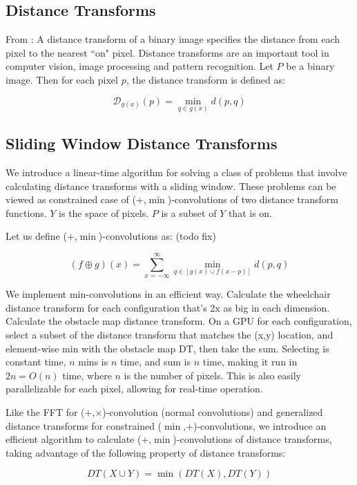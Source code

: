 \subsection{Distance Transforms}
From \cite{felzenszwalb2004distance}:
A distance transform of a binary image specifies the distance from each pixel to
the nearest ``on" pixel. Distance transforms are an important tool in computer
vision, image processing and pattern recognition.
Let $P$ be a binary image. Then for each pixel $p$, the distance transform is
defined as:

$$\mathcal{D}_{g(x)}(p) = \min_{q \in g(x)} d(p,q) $$

\subsection{Sliding Window Distance Transforms}
We introduce a linear-time algorithm for solving a class of problems that involve
calculating distance transforms with a sliding window. These problems can be
viewed as constrained case of ($+$,$\min$)-convolutions of two distance
transform functions. 
$Y$ is the space of pixels.
$P$ is a subset of $Y$ that is on.

Let us define ($+$,$\min$)-convolutions as: (todo fix)

$$ (f \oplus g) (x) = \sum_{x = -\infty}^\infty \min_{q \in [g(x) \cup f(x - p)]} d(p,q) $$


We implement min-convolutions in an efficient way.
Calculate the wheelchair distance transform for each configuration that's 2x as big in each dimension.
Calculate the obstacle map distance transform.
On a GPU for each configuration, select a subset of the distance transform that
matches the (x,y) location, and element-wise min with the obstacle map DT, then
take the sum. Selecting is constant time, $n$ mins is $n$ time, and sum is $n$
time, making it run in $2n = O(n)$ time, where $n$ is the number of pixels. This
is also easily parallelizable for each pixel, allowing for real-time operation.

Like the FFT for ($+$,$\times$)-convolution (normal convolutions) and generalized distance
transforms for constrained ($\min$,$+$)-convolutions, we introduce an efficient
algorithm to calculate ($+$,$\min$)-convolutions of distance transforms,
taking advantage of the following property of distance transforms:

$$DT(X \cup Y) = \min(DT(X), DT(Y))$$

